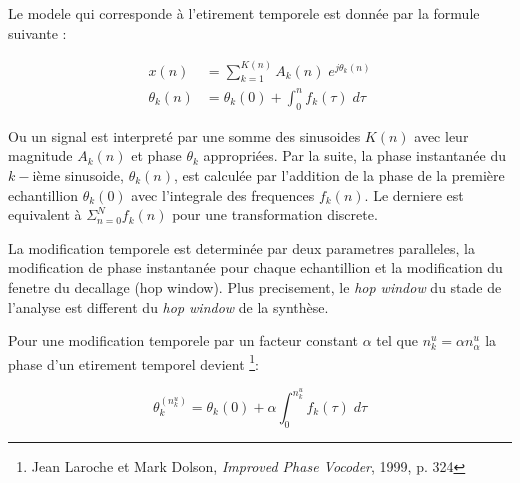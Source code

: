 Le modele qui corresponde à l'etirement temporele est donnée par la formule suivante :

    \begin{align}
         x(n) &= \sum_{k=1}^{K(n)} A_k(n) \; e^{j \theta_k (n)} \\
         \theta_k(n) &= \theta_k(0) + \int_{0}^{n} f_k (\tau) \; d\tau
    \end{align}

Ou un signal est interpreté par une somme des sinusoides $K(n)$ avec leur magnitude $A_k(n)$ et phase $\theta_k$ appropriées. Par la suite, la phase instantanée du $k-$ième sinusoide, $\theta_k(n)$, est calculée par l'addition de la phase de la première echantillion $\theta_k(0)$ avec l'integrale des frequences $f_k (n)$. Le derniere est equivalent à $\Sigma_{n=0}^N f_k(n)$ pour une transformation discrete.

La modification temporele est determinée par deux parametres paralleles, la modification de phase instantanée pour chaque echantillion et la modification du fenetre du decallage (hop window). Plus precisement, le \textit{hop window} du stade de l'analyse est different du \textit{hop window} de la synthèse.

Pour une modification temporele par un facteur constant $\alpha$ tel que $n_k^u = \alpha n_\alpha^u$ la phase d'un etirement temporel devient \footnote{Jean Laroche et Mark Dolson, \textit{Improved Phase Vocoder}, 1999, p. 324 \nocite{DoLa99}}:
    
    \begin{equation}
        \theta_k^(n_k^u) = \theta_k(0) + \alpha \int_0^{n_k^u}  f_k (\tau) \; d\tau
    \end{equation}



